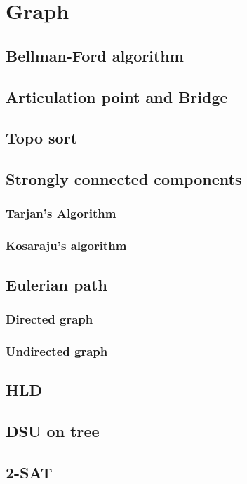 \section{Graph}

\subsection{Bellman-Ford algorithm}

\subsection{Articulation point and Bridge}

\subsection{Topo sort}

\subsection{Strongly connected components}
  \subsubsection{Tarjan's Algorithm}
  \subsubsection{Kosaraju's algorithm}


\subsection{Eulerian path}
  \subsubsection{Directed graph}

  \subsubsection{Undirected graph}

\subsection{HLD}

\subsection{DSU on tree}

\subsection{2-SAT}
